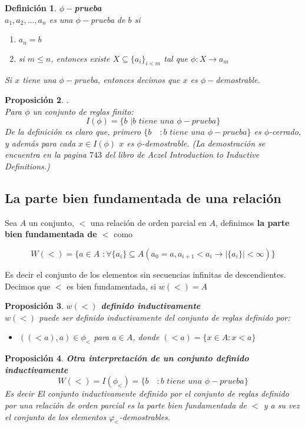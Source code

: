 \documentclass[executivepaper]{article}
\newtheorem{propo}{Proposición}[section]
\newtheorem{defi}[propo]{Definición}
\begin{document}
\begin{defi}
\textbf{$\phi-$prueba}\\
$a_1, a_2, \ldots, a_n$ es una $\phi-$prueba de $b$ si
\begin{enumerate}
\item $a_n = b$
\item si $m \leq n$, entonces existe $X\subseteq \{a_i\}_{i<m}$ tal que $\phi : X \rightarrow a_m$
\end{enumerate}
Si $x$ tiene una $\phi-$prueba, entonces decimos que $x$ es $\phi-$demostrable.
\end{defi}

\begin{propo}.\\
Para $\phi$ un conjunto de reglas finito:
$$I(\phi) = \{b \,\,|b\,\, {tiene}\,\, {una}\,\, \phi -{prueba} \}$$
De la definición es claro que, primero $\{b \quad: b\,\, tiene\,\, una\,\, \phi-prueba\}$ es $\phi$-cerrado, y además para cada $x \in I(\phi)$ $x$ es $\phi$-demostrable. (La demostración se encuentra en la pagina $743$ del libro de Aczel Introduction to Inductive Definitions.)
\end{propo}

\subsection*{La parte bien fundamentada de una relación}
Sea $A$ un conjunto, $<$ una relación de orden parcial en $A$, definimos \textbf{la parte bien fundamentada de $<$} como 

$$W(<) = \{a\in A\,\, : \forall \{a_i\}\subseteq A (a_0 = a, a_{i+1}<a_i\rightarrow |\{a_i\}|<\infty)\}$$

Es decir el conjunto de los elementos sin secuencias infinitas de descendientes.\\ 
Decimos que $<$ es bien fundamentada, si $w(<) = A$

\begin{propo}\textbf{$w(<)$ definido inductivamente}\\
    $w(<)$ puede ser definido inductivamente del conjunto de reglas definido por:
    \begin{itemize}
        \item $((<a),a) \in\phi_<$ para $a\in A$, donde $(<a) = \{x\in A: x<a\}$    
    \end{itemize} 
\end{propo}

\begin{propo}\textbf{Otra interpretación de un conjunto definido inductivamente}
    $$W(<) = I(\phi_<) = \{b \quad: b\,\, {tiene}\,\, {una}\,\, \phi-{prueba}\}$$
    Es decir El conjunto inductivamente definido por el conjunto de reglas definido por una relación de orden parcial es la parte bien fundamentada de $<$ y a su vez el conjunto de los elementos $\varphi_<$-demostrables.
\end{propo}
\end{document}

